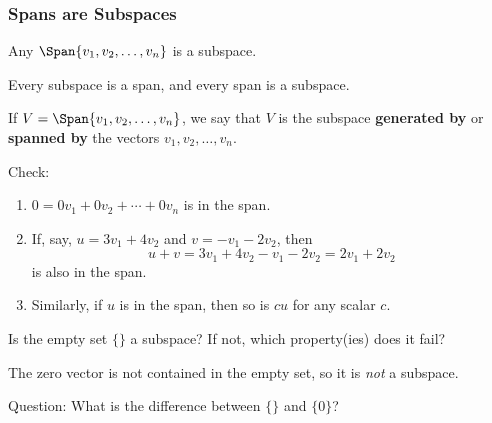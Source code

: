 
\begin{frame}
\frametitle{Spans are Subspaces}

\vskip-3mm
\begin{thm}
  Any $\Span\{v_1,v_2,\ldots,v_n\}$ is a subspace.
\end{thm}

\pause\medskip
\begin{bluebox}[!!!]{.7\linewidth}
  Every subspace is a span, and every span is a subspace.
\end{bluebox}

\pause
\begin{defn}
  If $V = \Span\{v_1,v_2,\ldots,v_n\}$, we say that $V$ is the
  subspace \textbf{generated by} or \textbf{spanned by}
  the vectors $v_1,v_2,\ldots,v_n$.
\end{defn}

\medskip
\begin{webonly}
\alert{Check:}
\begin{enumerate}
\item $0 = 0v_1 + 0v_2 + \cdots + 0v_n$ is in the span.
\item If, say, $u = 3v_1 + 4v_2$ and $v = -v_1 - 2v_2$, then
  \[ u + v = 3v_1 + 4v_2 -v_1 - 2v_2 = 2v_1 + 2v_2 \]
  is also in the span.
\item Similarly, if $u$ is in the span, then so is $cu$ for any scalar $c$.
\end{enumerate}
\end{webonly}

\end{frame}



\begin{pollframe}

\vfill

\begin{bluebox}[Poll]{.9\linewidth}
  Is the empty set $\{\}$ a subspace?  If not, which property(ies) does it fail?
\end{bluebox}

\pause\medskip
The zero vector is not contained in the empty set, so it is \emph{not} a
subspace.

\pause\bigskip
\alert{Question:} What is the difference between $\{\}$ and $\{0\}$?

\vfill

\end{pollframe}


